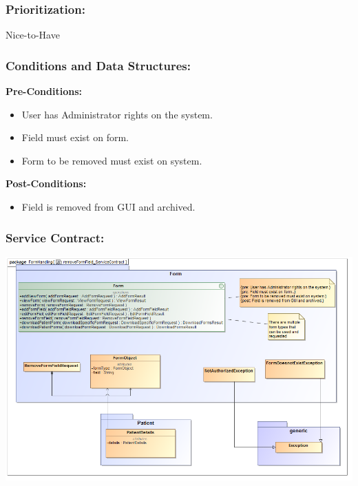 \subsubsection{Prioritization:}
Nice-to-Have
\subsubsection{Conditions and Data Structures:}
\textbf{Pre-Conditions:}
\begin{itemize}
	\item User has Administrator rights on the system.
	\item Field must exist on form.
	\item Form to be removed must exist on system.
\end{itemize}

\textbf{Post-Conditions:}	
\begin{itemize}
	\item Field is removed from GUI and archived.  
\end{itemize}
\subsubsection{Service Contract:} 
\includegraphics[width=1\linewidth]{./Graphics/FormUseCaseDiagrams/removeFormField_ServiceContract}
